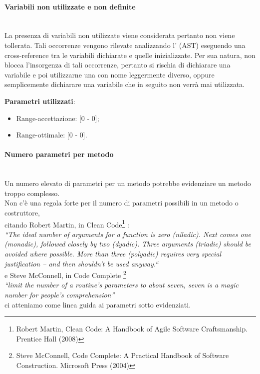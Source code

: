 			\paragraph{Variabili non utilizzate e non definite}\mbox{} \\
				
			La presenza di variabili non utilizzate viene considerata  pertanto non viene tollerata. Tali occorrenze vengono rilevate analizzando l' (AST) eseguendo una cross-reference tra le variabili dichiarate e quelle inizializzate. Per sua natura,  non blocca l'insorgenza di tali occorrenze, pertanto si rischia di dichiarare una variabile e poi utilizzarne una con nome leggermente diverso, oppure semplicemente dichiarare una variabile che in seguito non verrà mai utilizzata.
			
			\textbf{Parametri utilizzati}:
			\begin{itemize}
				\item Range-accettazione: [0 - 0];
				\item Range-ottimale: [0 - 0].
			\end{itemize}

			
			\paragraph{Numero parametri per metodo}\mbox{} \\
			Un numero elevato di parametri per un metodo potrebbe evidenziare un metodo troppo complesso.\\
			Non c'è una regola forte per il numero di parametri possibili in un metodo o costruttore, \\
			citando Robert Martin, in Clean Code\footnote{Robert Martin, Clean Code: A Handbook of Agile Software Craftsmanship. 	
			Prentice Hall (2008)} : \\ 
			\emph{“The ideal number of arguments for a function is zero (niladic). Next 
			comes 
			one (monadic), followed closely by two (dyadic). Three arguments (triadic) should be avoided where possible. More than 
			three (polyadic) requires very special justification – and then shouldn’t be used anyway.“} \\ 
			e Steve McConnell, in Code Complete \footnote{Steve McConnell, Code Complete: A Practical Handbook of Software
			Construction. Microsoft Press (2004)} \\
			 \emph{“limit the number of a routine’s parameters to about seven, seven is a magic number for people’s comprehension”}  
			\\
			ci atteniamo come linea guida ai parametri sotto evidenziati.
			
